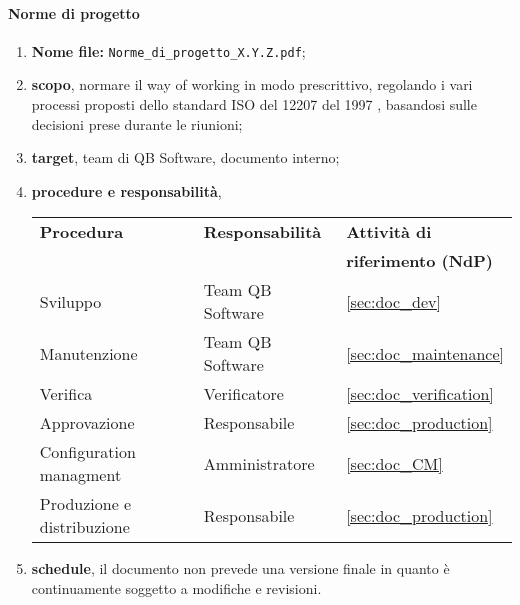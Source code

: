         \paragraph{Norme di progetto}
            \begin{enumerate}
                \item \textbf{Nome file:} \texttt{Norme\_di\_progetto\_X.Y.Z.pdf};
                \item \textbf{scopo}, normare il way of working in modo prescrittivo, regolando i vari processi proposti dello standard ISO del 12207 del 1997 \cite{bib:ISO12207_1997}, basandosi sulle decisioni prese durante le riunioni;
                \item \textbf{target}, team di QB Software, documento interno;
                \item \textbf{procedure e responsabilità},
                \\
                \begin{tabularx}{0.93\textwidth}{|X|X|X|}
                    \hline
                    \textbf{Procedura} & \textbf{Responsabilità} & \textbf{Attività di} \\
                    & & \textbf{riferimento (NdP)} \\
                    \hline
                    Sviluppo & Team QB Software &  \ref{sec:doc_dev}
                    \\\hline
                    Manutenzione & Team QB Software & \ref{sec:doc_maintenance} 
                    \\\hline
                    Verifica & Verificatore & \ref{sec:doc_verification}
                    \\\hline
                    Approvazione & Responsabile & \ref{sec:doc_production}
                    \\\hline
                    Configuration managment & Amministratore & \ref{sec:doc_CM}
                    \\\hline
                    Produzione e distribuzione & Responsabile & \ref{sec:doc_production}
                    \\\hline
                \end{tabularx}
                \item \textbf{schedule}, il documento non prevede una versione finale in quanto è continuamente soggetto a modifiche e revisioni. 
            \end{enumerate}
            
